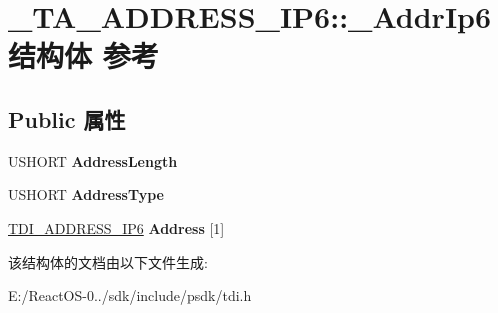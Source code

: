 \hypertarget{struct___t_a___a_d_d_r_e_s_s___i_p6_1_1___addr_ip6}{}\section{\+\_\+\+T\+A\+\_\+\+A\+D\+D\+R\+E\+S\+S\+\_\+\+I\+P6\+:\+:\+\_\+\+Addr\+Ip6结构体 参考}
\label{struct___t_a___a_d_d_r_e_s_s___i_p6_1_1___addr_ip6}
\subsection*{Public 属性}
\begin{DoxyCompactItemize}
\item 
\mbox{\label{struct___t_a___a_d_d_r_e_s_s___i_p6_1_1___addr_ip6_addfd906ba1f2f94cec6db106e454d6bd}} 
U\+S\+H\+O\+RT {\bfseries Address\+Length}
\item 
\mbox{\label{struct___t_a___a_d_d_r_e_s_s___i_p6_1_1___addr_ip6_a862cc8709fcb56d277582d16461ca71e}} 
U\+S\+H\+O\+RT {\bfseries Address\+Type}
\item 
\mbox{\label{struct___t_a___a_d_d_r_e_s_s___i_p6_1_1___addr_ip6_a649351db96dd354334e5dafe0c266383}} 
\hyperlink{struct___t_d_i___a_d_d_r_e_s_s___i_p6}{T\+D\+I\+\_\+\+A\+D\+D\+R\+E\+S\+S\+\_\+\+I\+P6} {\bfseries Address} \mbox{[}1\mbox{]}
\end{DoxyCompactItemize}


该结构体的文档由以下文件生成\+:\begin{DoxyCompactItemize}
\item 
E\+:/\+React\+O\+S-\/0../sdk/include/psdk/tdi.\+h\end{DoxyCompactItemize}
